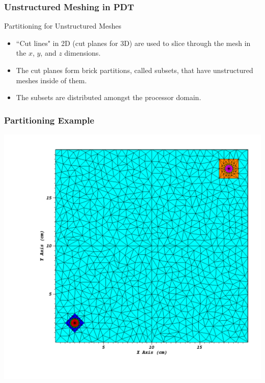 \documentclass[xcolor={usenames,dvipsnames,svgnames,table}]{beamer}
\begin{document}
\begin{frame}[t]\frametitle{Unstructured Meshing in PDT}
\begin{block}{Partitioning for Unstructured Meshes}
\begin{itemize}
\item ``Cut lines" in 2D (cut planes for 3D) are used to slice through the mesh in the $x$, $y$, and $z$ dimensions.
\item The cut planes form brick partitions, called subsets, that have unstructured meshes inside of them. 
\item The subsets are distributed amongst the processor domain.
\end{itemize}
\end{block}
\end{frame}

\begin{frame}[t]\frametitle{Partitioning Example}
\centering
\includegraphics[scale=0.45,trim={0.95in 0.64in 0.35in 0.44in},clip]{figures/partitioning_example.pdf}
\end{frame}
\end{document}
